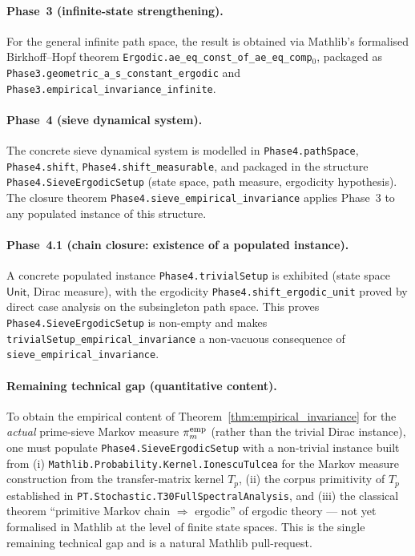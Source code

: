 \paragraph{Phase~3 (infinite-state strengthening).}
For the general infinite path space, the result is obtained via
Mathlib's formalised Birkhoff--Hopf theorem
\texttt{Ergodic.ae\_eq\_const\_of\_ae\_eq\_comp$_0$}, packaged as
\texttt{Phase3.geometric\_a\_s\_constant\_ergodic} and
\texttt{Phase3.empirical\_invariance\_infinite}.

\paragraph{Phase~4 (sieve dynamical system).}
The concrete sieve dynamical system is modelled in
\texttt{Phase4.pathSpace}, \texttt{Phase4.shift},
\texttt{Phase4.shift\_measurable}, and packaged in the structure
\texttt{Phase4.SieveErgodicSetup} (state space, path measure,
ergodicity hypothesis). The closure theorem
\texttt{Phase4.sieve\_empirical\_invariance} applies Phase~3 to any
populated instance of this structure.

\paragraph{Phase~4.1 (chain closure: existence of a populated instance).}
A concrete populated instance \texttt{Phase4.trivialSetup} is
exhibited (state space $\mathsf{Unit}$, Dirac measure), with the
ergodicity \texttt{Phase4.shift\_ergodic\_unit} proved by direct
case analysis on the subsingleton path space. This proves
\texttt{Phase4.SieveErgodicSetup} is non-empty and makes
\texttt{trivialSetup\_empirical\_invariance} a non-vacuous
consequence of \texttt{sieve\_empirical\_invariance}.

\paragraph{Remaining technical gap (quantitative content).}
To obtain the empirical content of Theorem~\ref{thm:empirical_invariance}
for the \emph{actual} prime-sieve Markov measure $\pi_m^{\rm emp}$
(rather than the trivial Dirac instance), one must populate
\texttt{Phase4.SieveErgodicSetup} with a non-trivial instance built
from (i) \texttt{Mathlib.Probability.Kernel.IonescuTulcea} for the
Markov measure construction from the transfer-matrix kernel $T_p$,
(ii) the corpus primitivity of $T_p$ established in
\texttt{PT.Stochastic.T30FullSpectralAnalysis}, and (iii) the
classical theorem ``primitive Markov chain $\Rightarrow$ ergodic''
of ergodic theory --- not yet formalised in Mathlib at the level of
finite state spaces. This is the single remaining technical gap and
is a natural Mathlib pull-request.

